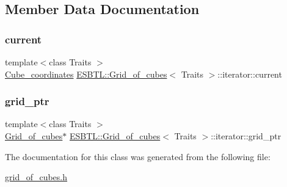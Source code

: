 \subsection{Member Data Documentation}
\mbox{\label{classESBTL_1_1Grid__of__cubes_1_1iterator_ab757f8b4d627babbf64ecc13a6de06f6}} 
\subsubsection{\texorpdfstring{current}{current}}
{\footnotesize\ttfamily template$<$class Traits $>$ \\
\hyperlink{structESBTL_1_1Grid__of__cubes_ad55c84346bab961e08d95e494551d07d}{Cube\+\_\+coordinates} \hyperlink{structESBTL_1_1Grid__of__cubes}{E\+S\+B\+T\+L\+::\+Grid\+\_\+of\+\_\+cubes}$<$ Traits $>$\+::iterator\+::current\hspace{0.3cm}{\ttfamily [protected]}}

\mbox{\label{classESBTL_1_1Grid__of__cubes_1_1iterator_a492fb31fc0f9f1f7f61914a45bb7ed2e}} 
\subsubsection{\texorpdfstring{grid\+\_\+ptr}{grid\_ptr}}
{\footnotesize\ttfamily template$<$class Traits $>$ \\
\hyperlink{structESBTL_1_1Grid__of__cubes}{Grid\+\_\+of\+\_\+cubes}$\ast$ \hyperlink{structESBTL_1_1Grid__of__cubes}{E\+S\+B\+T\+L\+::\+Grid\+\_\+of\+\_\+cubes}$<$ Traits $>$\+::iterator\+::grid\+\_\+ptr\hspace{0.3cm}{\ttfamily [protected]}}



The documentation for this class was generated from the following file\+:\begin{DoxyCompactItemize}
\item 
\hyperlink{grid__of__cubes_8h}{grid\+\_\+of\+\_\+cubes.\+h}\end{DoxyCompactItemize}
